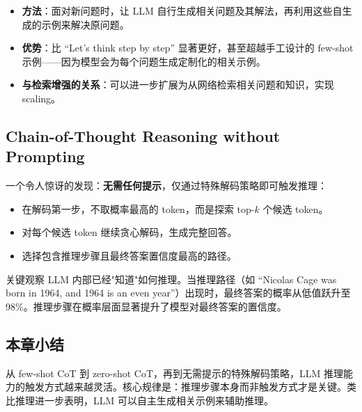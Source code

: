 \begin{itemize}
    \item \textbf{方法}：面对新问题时，让 LLM 自行生成相关问题及其解法，再利用这些自生成的示例来解决原问题。
    \item \textbf{优势}：比 ``Let's think step by step'' 显著更好，甚至超越手工设计的 few-shot 示例——因为模型会为每个问题生成定制化的相关示例。
    \item \textbf{与检索增强的关系}：可以进一步扩展为从网络检索相关问题和知识，实现 scaling。
\end{itemize}

\subsection{Chain-of-Thought Reasoning without Prompting}

一个令人惊讶的发现：\textbf{无需任何提示}，仅通过特殊解码策略即可触发推理：

\begin{itemize}
    \item 在解码第一步，不取概率最高的 token，而是探索 top-$k$ 个候选 token。
    \item 对每个候选 token 继续贪心解码，生成完整回答。
    \item 选择包含推理步骤且最终答案置信度最高的路径。
\end{itemize}

\begin{importantbox}{关键观察}
LLM 内部已经"知道"如何推理。当推理路径（如 ``Nicolas Cage was born in 1964, and 1964 is an even year''）出现时，最终答案的概率从低值跃升至 98\%。推理步骤在概率层面显著提升了模型对最终答案的置信度。
\end{importantbox}

\subsection{本章小结}

从 few-shot CoT 到 zero-shot CoT，再到无需提示的特殊解码策略，LLM 推理能力的触发方式越来越灵活。核心规律是：推理步骤本身而非触发方式才是关键。类比推理进一步表明，LLM 可以自主生成相关示例来辅助推理。

